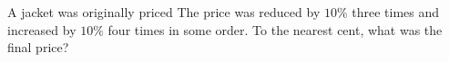A jacket was originally priced  The price was reduced by $10\%$ three times and increased by $10\%$ four times in some order. To the nearest cent, what was the final price?
